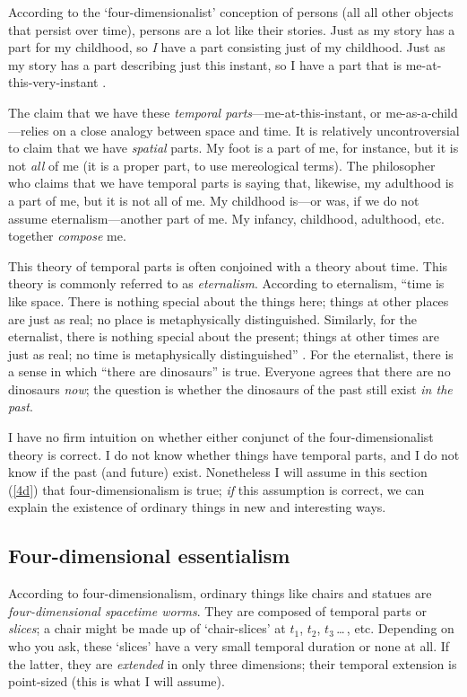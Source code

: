 \documentclass[11pt]{article}
\newenvironment{squote}{%
\begin{spacing}{1}
\begin{list}{}{%
\setlength{\labelwidth}{0pt}%
\rightmargin\leftmargin%
}
\item\relax
}{%
\end{list}%
\end{spacing}
}
\begin{document}
\begin{spacing}{1.5}
\begin{squote}
According to the `four-dimensionalist' conception of persons (all all
other objects that persist over time), persons are a lot like their
stories.  Just as my story has a part for my childhood, so {\em I}
have a part consisting just of my childhood.  Just as my story has a
part describing just this instant, so I have a part that is
me-at-this-very-instant \citeyearpar[1]{sider2001}.
\end{squote}

The claim that we have these {\em temporal
  parts}---me-at-this-instant, or me-as-a-child---relies on a close
analogy between space and time.  It is relatively uncontroversial to
claim that we have {\em spatial} parts.  My foot is a part of me, for
instance, but it is not {\em all} of me (it is a proper part, to use
mereological terms).  The philosopher who claims that we have temporal
parts is saying that, likewise, my adulthood is a part of me, but it
is not all of me.  My childhood is---or was, if we do not assume
eternalism---another part of me.  My infancy, childhood, adulthood,
etc. together {\em compose} me.

This theory of temporal parts is often conjoined with a theory about
time.  This theory is commonly referred to as {\em eternalism}.
According to eternalism, ``time is like space.  There is nothing
special about the things here; things at other places are just as
real; no place is metaphysically distinguished.  Similarly, for the
eternalist, there is nothing special about the present; things at
other times are just as real; no time is metaphysically
distinguished'' \citep[122]{hinchliff1996}.  For the eternalist, there
is a sense in which ``there are dinosaurs'' is true.  Everyone agrees
that there are no dinosaurs {\em now}; the question is whether the
dinosaurs of the past still exist {\em in the past}.  

I have no firm intuition on whether either conjunct of the
four-dimensionalist theory is correct.  I do not know whether things
have temporal parts, and I do not know if the past (and future) exist.
Nonetheless I will assume in this section (\ref{4d}) that
four-dimensionalism is true; {\em if} this assumption is correct, we
can explain the existence of ordinary things in new and interesting
ways.

\subsection{Four-dimensional essentialism}
\label{4de}
According to four-dimensionalism, ordinary things like chairs and
statues are {\em four-dimensional spacetime worms}.  They are composed
of temporal parts or {\em slices}; a chair might be made up of
`chair-slices' at $t_{1}$, $t_{2}$, $t_{3}$\,\ldots\,, etc.  Depending
on who you ask, these `slices' have a very small temporal duration or
none at all.  If the latter, they are {\em extended} in only three
dimensions; their temporal extension is point-sized (this is what I
will assume).


\end{spacing}
\end{document}
